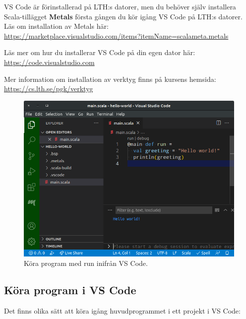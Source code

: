 VS Code är förinstallerad på LTH:s datorer, men du behöver själv installera Scala-tillägget \textbf{Metals} första gången du kör igång VS Code på LTH:s datorer. Läs om installation av Metals här: \\
\url{https://marketplace.visualstudio.com/items?itemName=scalameta.metals} 

Läs mer om hur du installerar VS Code på din egen dator här: \\\url{https://code.visualstudio.com}

Mer information om installation av verktyg finns på kursens hemsida: \\
\url{https://cs.lth.se/pgk/verktyg}

\begin{figure}
\centering
\includegraphics[width=1.0\textwidth]{../img/vscode-run}
\caption{Köra program med \textsf{run} inifrån VS Code.\label{appendix-ide:vscode-run}}
\end{figure}

\subsection{Köra program i VS Code}

Det finns olika sätt att köra igång huvudprogrammet i ett projekt i VS Code:

